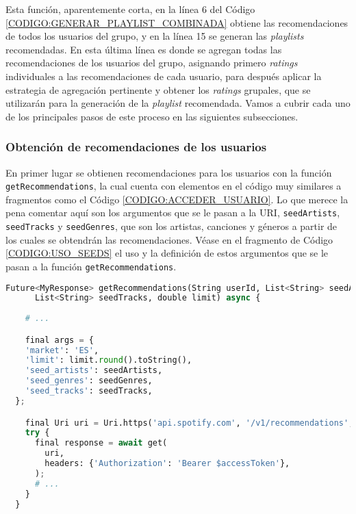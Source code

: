 Esta función, aparentemente corta, en la línea 6 del Código \ref{CODIGO:GENERAR_PLAYLIST_COMBINADA} obtiene las recomendaciones de todos los usuarios del grupo, y en la línea 15 se 
generan las \textit{playlists} recomendadas. En esta última línea es donde se agregan todas las recomendaciones de los usuarios del grupo, 
asignando primero \textit{ratings} individuales a las recomendaciones de cada usuario, para después aplicar la estrategia de agregación pertinente y obtener
los \textit{ratings} grupales, que se utilizarán para la generación de la \textit{playlist} recomendada. Vamos a cubrir cada uno de los principales
pasos de este proceso en las siguientes subsecciones.


\subsubsection{Obtención de recomendaciones de los usuarios\label{subsec:obtencion_recomendaciones_implementacion}}

En primer lugar se obtienen recomendaciones para los usuarios con la función \texttt{getRecommendations}, la cual cuenta con 
elementos en el código muy similares a fragmentos como el Código \ref{CODIGO:ACCEDER_USUARIO}. Lo que merece la pena comentar aquí 
son los argumentos que se le pasan a la URI, \texttt{seedArtists}, \texttt{seedTracks} y \texttt{seedGenres}, que son los artistas, canciones y 
géneros a partir de los cuales se obtendrán las recomendaciones. Véase en el fragmento de Código \ref{CODIGO:USO_SEEDS} el uso y la definición de estos 
argumentos que se le pasan a la función \texttt{getRecommendations}.

\begin{lstlisting}[language=python, caption=Definición de los argumentos \texttt{seedArtists} y \texttt{seedTracks}, label=CODIGO:USO_SEEDS]
  Future<MyResponse> getRecommendations(String userId, List<String> seedArtists,
      List<String> seedTracks, double limit) async {
    
    # ...

    final args = {
    'market': 'ES',
    'limit': limit.round().toString(),
    'seed_artists': seedArtists,
    'seed_genres': seedGenres,
    'seed_tracks': seedTracks,
  };

    final Uri uri = Uri.https('api.spotify.com', '/v1/recommendations', args);
    try {
      final response = await get(
        uri,
        headers: {'Authorization': 'Bearer $accessToken'},
      );
      # ...
    }
  }
\end{lstlisting}

